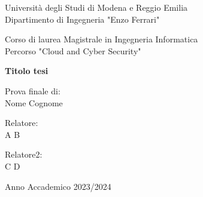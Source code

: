 
\begin{titlepage}
    \begin{center}

		Università degli Studi di Modena e Reggio Emilia\\
		\large
		Dipartimento di Ingegneria "Enzo Ferrari"

        \vspace{2.5cm}
        
		\Large
		Corso di laurea Magistrale in Ingegneria Informatica\\
		
		\large
		Percorso "Cloud and Cyber Security"		
		
		\vspace{2.5cm}
        
        \Huge
        \textbf{Titolo tesi}

        \vspace{3cm}

		\large
		

		\begin{flushright}
		Prova finale di:\\
		Nome Cognome
		\end{flushright}		        
        
        
		\Large        
        \vspace{3cm}
        
        \begin{flushleft}
        Relatore:\\
        A B
        \end{flushleft}
                
        \begin{flushleft}
        Relatore2:\\
        C D
        \end{flushleft}
            
		\vfill
		
		\small
		Anno Accademico 2023/2024
            
    \end{center}
\end{titlepage}